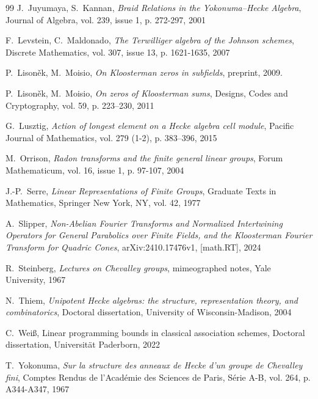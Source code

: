\documentclass[12pt,reqno]{amsart}
\theoremstyle{definition}
\theoremstyle{remark}
\numberwithin{equation}{section}
\def\IM#1{\textcolor[rgb]{0.00,0.00,0.75}{[I: #1]}}
\begin{document}
\begin{thebibliography}{99}
J.~Juyumaya, S.~Kannan, {\em Braid Relations in the Yokonuma–Hecke Algebra}, Journal of Algebra, vol. 239, issue 1, p. 272-297, 2001

F.~Levstein, C.~Maldonado, {\em The Terwilliger algebra of the Johnson schemes}, Discrete Mathematics, vol. 307, issue 13, p. 1621-1635, 2007

P.~Lison\v{e}k, M.~Moisio, {\em On Kloosterman zeros in subfields}, preprint, 2009.

P.~Lison\v{e}k, M.~Moisio, {\em On zeros of Kloosterman sums}, Designs, Codes and Cryptography,  vol. 59, p. 223–230, 2011

G.~Lusztig, {\em Action of longest element on a Hecke algebra cell module}, Pacific Journal of Mathematics, vol. 279 (1-2), p. 383–396, 2015

M.~Orrison, {\em Radon transforms and the finite general linear groups}, Forum Mathematicum, vol. 16, issue 1, p. 97-107, 2004

J.-P.~Serre, {\em Linear Representations of Finite Groups}, Graduate Texts in Mathematics, Springer New York, NY, vol. 42, 1977

A.~Slipper, {\em Non-Abelian Fourier Transforms and Normalized Intertwining Operators for General Parabolics over Finite Fields, and the Kloosterman Fourier Transform for Quadric Cones}, arXiv:2410.17476v1, [math.RT], 2024

R.~Steinberg, {\em Lectures on Chevalley groups}, mimeographed notes, Yale University, 1967

N.~Thiem, {\em Unipotent Hecke algebras: the structure, representation theory, and combinatorics}, Doctoral dissertation, University of Wisconsin-Madison, 2004

C.~Wei{\ss}, {Linear programming bounds in
classical association schemes}, Doctoral dissertation, Universit\"at Paderborn, 2022

T.~Yokonuma, {\em Sur la structure des anneaux de Hecke d’un groupe de Chevalley fini}, Comptes Rendus de l'Acad\'emie des Sciences de Paris, S\'erie A-B, vol. 264, p. A344-A347, 1967


\end{thebibliography}
\end{document}
